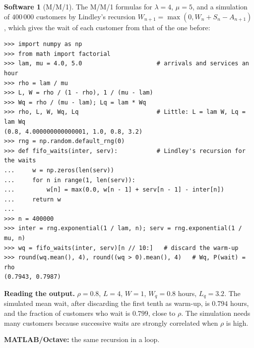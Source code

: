 \documentclass[11pt,a4paper]{article}
\numberwithin{equation}{section}
\theoremstyle{definition}
\newtheorem{software}[thm]{Software}
\begin{document}
\begin{software}[M/M/1]
\label{sw:mm1}
The M/M/1 formulas for $\lambda = 4$, $\mu = 5$, and a simulation of $400\,000$ customers by Lindley's recursion $W_{n + 1} = \max(0, W_n + S_n - A_{n + 1})$, which gives the wait of each customer from that of the one before:
{\small\begin{verbatim}
>>> import numpy as np
>>> from math import factorial
>>> lam, mu = 4.0, 5.0                     # arrivals and services an hour
>>> rho = lam / mu
>>> L, W = rho / (1 - rho), 1 / (mu - lam)
>>> Wq = rho / (mu - lam); Lq = lam * Wq
>>> rho, L, W, Wq, Lq                      # Little: L = lam W, Lq = lam Wq
(0.8, 4.000000000000001, 1.0, 0.8, 3.2)
>>> rng = np.random.default_rng(0)
>>> def fifo_waits(inter, serv):           # Lindley's recursion for the waits
...     w = np.zeros(len(serv))
...     for n in range(1, len(serv)):
...         w[n] = max(0.0, w[n - 1] + serv[n - 1] - inter[n])
...     return w
...
>>> n = 400000
>>> inter = rng.exponential(1 / lam, n); serv = rng.exponential(1 / mu, n)
>>> wq = fifo_waits(inter, serv)[n // 10:]   # discard the warm-up
>>> round(wq.mean(), 4), round((wq > 0).mean(), 4)   # Wq, P(wait) = rho
(0.7943, 0.7987)
\end{verbatim}}
\textbf{Reading the output.} $\rho = 0.8$, $L = 4$, $W = 1$, $W_q = 0.8$ hours, $L_q = 3.2$. The simulated mean wait, after discarding the first tenth as warm-up, is $0.794$ hours, and the fraction of customers who wait is $0.799$, close to $\rho$. The simulation needs many customers because successive waits are strongly correlated
when $\rho$ is high.

\textbf{MATLAB/Octave:} the same recursion in a loop.
\end{software}
\end{document}
